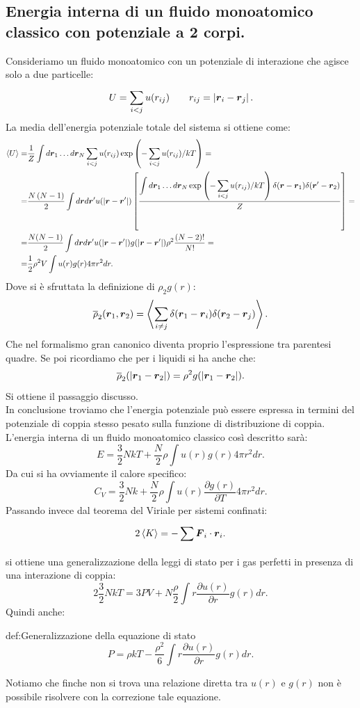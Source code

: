 \subsection{Energia interna di un fluido monoatomico classico con potenziale a 2 corpi.}
\label{subsec:Energia interna di un fluido monoatomico classico con potenziale a 2 corpi.}
Consideriamo un fluido monoatomico con un potenziale di interazione che agisce solo a due particelle:
\[
	U = \sum_{i<j}^{} u(r_{ij}) \quad \quad  r_{ij} = \left| \boldsymbol{r}_i - \boldsymbol{r}_j \right| 
.\] 
La media dell'energia potenziale totale del sistema si ottiene come:
\[\begin{aligned}
	\left<U \right> 
	=&
	\frac{1}{Z}\int d \boldsymbol{r}_1\ldots d \boldsymbol{r}_N 
	\sum_{i<j}^{} u(r_{ij})
	\exp\left( -\sum_{i<j}^{} u(r_{ij})/kT \right) =\\
	=&
	\frac{N\left( N-1 \right) }{2} 
	\int d \boldsymbol{r}d \boldsymbol{r}' u(\left|\boldsymbol{r}-\boldsymbol{r}'\right|)
	\left[ 
	\frac{\displaystyle 
	\int d\boldsymbol{r}_1\ldots d\boldsymbol{r}_N
	\exp\left(-\sum_{i<j}^{} u(r_{ij})/kT\right) 
	\delta(\boldsymbol{r}-\boldsymbol{r}_1)\delta(\boldsymbol{r}'-\boldsymbol{r}_2)
	}{\displaystyle Z} \right] =\\
	=&
	\frac{N(N-1)}{2} \int d \boldsymbol{r} d \boldsymbol{r}' u(\left| \boldsymbol{r}-\boldsymbol{r}' \right|)
	g(\left| \boldsymbol{r}-\boldsymbol{r}' \right|)\rho ^2\frac{\left( N-2 \right)!}{N!} =\\
	=&
	\frac{1}{2} \rho ^2 V \int u(r)g(r)4\pi r^2 dr
.\end{aligned}\]
Dove si è sfruttata la definizione di $\rho_2 g(r)$:
\[
	\overline{\rho }_2(\boldsymbol{r}_1,\boldsymbol{r}_2) 
	= 
	\left< \sum_{i\neq j}^{} \delta(\boldsymbol{r}_1 -\boldsymbol{r}_i)\delta(\boldsymbol{r}_2 - \boldsymbol{r}_j) \right>
.\] 
Che nel formalismo gran canonico diventa proprio l'espressione tra parentesi quadre. Se poi ricordiamo che per i liquidi si ha anche che:
\[
	\overline{\rho }_2(\left| \boldsymbol{r}_1 -\boldsymbol{r}_2 \right| )
	=
	\rho ^2 g(\left| \boldsymbol{r}_1 - \boldsymbol{r}_2 \right| )
.\] 
Si ottiene il passaggio discusso.\\
In conclusione troviamo che l'energia potenziale può essere espressa in termini del potenziale di coppia stesso pesato sulla funzione di distribuzione di coppia. L'energia interna di un fluido monoatomico classico così descritto sarà:
\[
	E = \frac{3}{2}NkT 
	+
	\frac{N}{2}\rho \int u(r)g(r)4\pi r^2 dr
.\] 
Da cui si ha ovviamente il calore specifico:
\[
	C_V =
	\frac{3}{2}Nk 
	+
	\frac{N}{2}\rho \int u(r)\frac{\partial g(r)}{\partial T} 4\pi r^2 dr
.\] 
Passando invece dal teorema del Viriale per sistemi confinati:
\[
	2\left<K \right> = - \sum_{}^{} \boldsymbol{F}_i\cdot\boldsymbol{r}_i
.\] 
si ottiene una generalizzazione della leggi di stato per i gas perfetti in presenza di una interazione di coppia:
\[
	2 \frac{3}{2}NkT 
	=
	3PV
	+
	N \frac{\rho }{2}\int r \frac{\partial u(r)}{\partial r} g(r) dr
	\label{eq:virial-trick}
.\] 
Quindi anche:
\begin{defn}{def:Generalizzazione della equazione di stato}
	\[
	P 
	=
	\rho kT - \frac{\rho ^2}{6}\int r \frac{\partial u(r)}{\partial r} g(r) dr
	.\]
\end{defn}
Notiamo che finche non si trova una relazione diretta tra $u(r)$ e $g(r)$ non è possibile risolvere con la correzione tale equazione.
